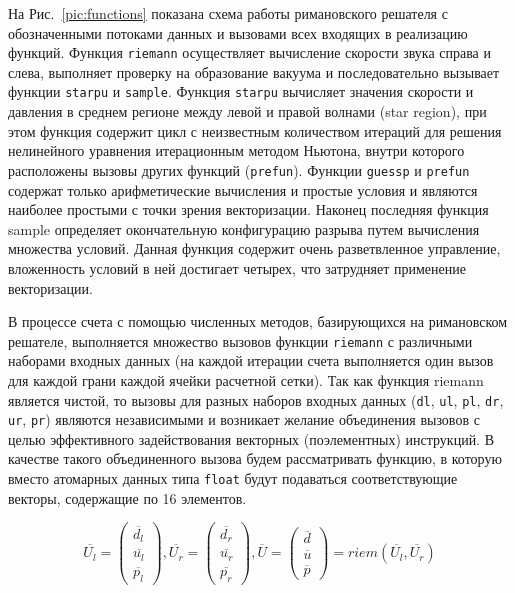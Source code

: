 \documentclass[utf8]{psta}
\begin{document}
На Рис.~\ref{pic:functions} показана схема работы римановского решателя с обозначенными потоками данных и вызовами всех входящих в реализацию функций. Функция \texttt{riemann} осуществляет вычисление скорости звука справа и слева, выполняет проверку на образование вакуума и последовательно вызывает функции \texttt{starpu} и \texttt{sample}.
Функция \texttt{starpu} вычисляет значения скорости и давления в среднем регионе между левой и правой волнами (star region), при этом функция содержит цикл с неизвестным количеством итераций для решения нелинейного уравнения итерационным методом Ньютона, внутри которого расположены вызовы других функций (\texttt{prefun}).
Функции \texttt{guessp} и \texttt{prefun} содержат только арифметические вычисления и простые условия и являются наиболее простыми с точки зрения векторизации.
Наконец последняя функция sample определяет окончательную конфигурацию разрыва путем вычисления множества условий.
Данная функция содержит очень разветвленное управление, вложенность условий в ней достигает четырех, что затрудняет применение векторизации.

В процессе счета с помощью численных методов, базирующихся на римановском решателе, выполняется множество вызовов функции \texttt{riemann} с различными наборами входных данных (на каждой итерации счета выполняется один вызов для каждой грани каждой ячейки расчетной сетки).
Так как функция riemann является чистой, то вызовы для разных наборов входных данных (\texttt{dl}, \texttt{ul}, \texttt{pl}, \texttt{dr}, \texttt{ur}, \texttt{pr}) являются независимыми и возникает желание объединения вызовов с целью эффективного задействования векторных (поэлементных) инструкций.
В качестве такого объединенного вызова будем рассматривать функцию, в которую вместо атомарных данных типа \texttt{float} будут подаваться соответствующие векторы, содержащие по 16 элементов.

\begin{equation}\label{eq:riemann_16}
\overline{U_l} = \left( \begin{array}{ccc} \overline{d_l} \\ \overline{u_l} \\ \overline{p_l} \end{array} \right),
\overline{U_r} = \left( \begin{array}{ccc} \overline{d_r} \\ \overline{u_r} \\ \overline{p_r} \end{array} \right),
\overline{U} = \left( \begin{array}{ccc} \overline{d} \\ \overline{u} \\ \overline{p} \end{array} \right) = riem(\overline{U_l}, \overline{U_r})
\end{equation}
\end{document}
